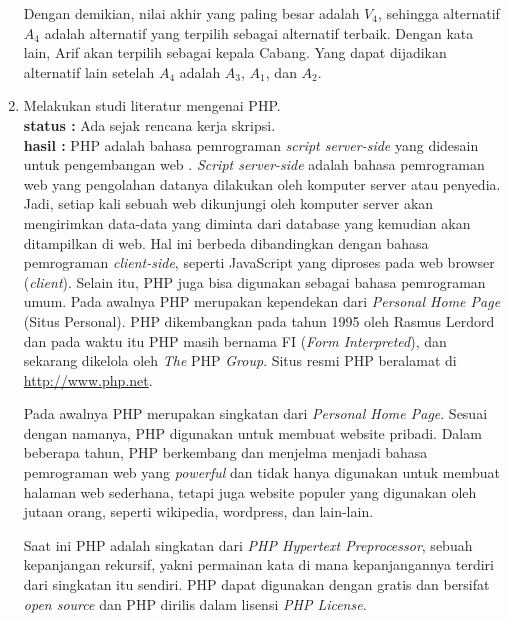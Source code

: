 \documentclass[a4paper,twoside]{article}
\begin{document}
\begin{enumerate}
Dengan demikian, nilai akhir yang paling besar adalah $V_{4}$, sehingga alternatif $A_{4}$ adalah alternatif yang terpilih sebagai alternatif terbaik. Dengan kata lain, Arif akan terpilih sebagai kepala Cabang. Yang dapat dijadikan alternatif lain setelah $A_{4}$ adalah $A_{3}$, $A_{1}$, dan $A_{2}$.

\item Melakukan studi literatur mengenai PHP.\\
		{\bf status :} Ada sejak rencana kerja skripsi.\\
		{\bf hasil :} PHP adalah bahasa pemrograman \textit{script server-side} yang didesain untuk pengembangan web \cite{php2}.  \textit{Script server-side} adalah bahasa pemrograman web yang pengolahan datanya dilakukan oleh komputer server atau penyedia. Jadi, setiap kali sebuah web dikunjungi oleh komputer server akan mengirimkan data-data yang diminta dari database yang kemudian akan ditampilkan di web. Hal ini berbeda dibandingkan dengan bahasa pemrograman \textit{client-side}, seperti JavaScript yang diproses pada web browser (\textit{client}). Selain itu, PHP juga bisa digunakan sebagai bahasa pemrograman umum. Pada awalnya PHP merupakan kependekan dari \textit{Personal Home Page} (Situs Personal). PHP dikembangkan pada tahun 1995 oleh Rasmus Lerdord dan pada waktu itu PHP masih bernama FI (\textit{Form Interpreted}), dan sekarang dikelola oleh \textit{The} PHP \textit{Group}. Situs resmi PHP beralamat di \url{http://www.php.net}.
	
	Pada awalnya PHP merupakan singkatan dari \textit{Personal Home Page}. Sesuai dengan namanya, PHP digunakan untuk membuat website pribadi. Dalam beberapa tahun, PHP berkembang dan menjelma menjadi bahasa pemrograman web yang \textit{powerful} dan tidak hanya digunakan untuk membuat halaman web sederhana, tetapi juga website populer yang digunakan oleh jutaan orang, seperti wikipedia, wordpress, dan lain-lain.
	
	Saat ini PHP adalah singkatan dari \textit{PHP Hypertext Preprocessor}, sebuah kepanjangan rekursif, yakni permainan kata di mana kepanjangannya terdiri dari singkatan itu sendiri. PHP dapat digunakan dengan gratis dan bersifat \textit{open source} dan PHP dirilis dalam lisensi \textit{PHP License}.
	

\end{enumerate}
\end{document}
